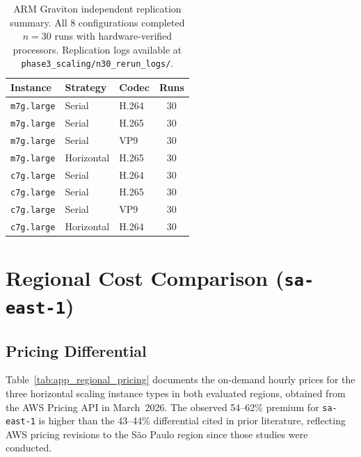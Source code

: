 \documentclass[conference]{IEEEtran}
\begin{document}
\begin{table}[!htbp]
\centering
\caption{ARM Graviton independent replication summary.
All 8 configurations completed $n=30$ runs with hardware-verified processors.
Replication logs available at \texttt{phase3\_scaling/n30\_rerun\_logs/}.}
\label{tab:app_rerun_summary}
\small
\begin{tabular}{lllc}
\toprule
\textbf{Instance} & \textbf{Strategy} & \textbf{Codec} & \textbf{Runs} \\
\midrule
\texttt{m7g.large} & Serial     & H.264 & 30 \\
\texttt{m7g.large} & Serial     & H.265 & 30 \\
\texttt{m7g.large} & Serial     & VP9   & 30 \\
\texttt{m7g.large} & Horizontal & H.265 & 30 \\
\texttt{c7g.large} & Serial     & H.264 & 30 \\
\texttt{c7g.large} & Serial     & H.265 & 30 \\
\texttt{c7g.large} & Serial     & VP9   & 30 \\
\texttt{c7g.large} & Horizontal & H.264 & 30 \\
\bottomrule
\end{tabular}
\end{table}

\section{Regional Cost Comparison (\texttt{sa-east-1})}
\label{app:regional}

\subsection{Pricing Differential}

Table~\ref{tab:app_regional_pricing} documents the on-demand hourly prices for
the three horizontal scaling instance types in both evaluated regions, obtained
from the AWS Pricing API in March~2026. The observed 54--62\% premium for
\texttt{sa-east-1} is higher than the 43--44\% differential cited in prior
literature, reflecting AWS pricing revisions to the São Paulo region since those
studies were conducted.
\end{document}
